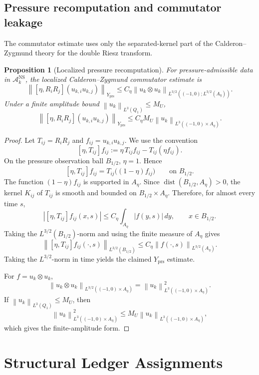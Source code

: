 \documentclass[11pt]{article}
\numberwithin{equation}{section}
\theoremstyle{plain}
\newtheorem{proposition}[theorem]{Proposition}
\theoremstyle{definition}
\theoremstyle{remark}
\newcommand{\NS}{\mathrm{NS}}
\newcommand{\prs}{\mathrm{prs}}
\newcommand{\A}{\mathcal A}
\newcommand{\norm}[1]{\left\lVert #1\right\rVert}
\begin{document}
\subsection{Pressure recomputation and commutator leakage}

The commutator estimate uses only the separated-kernel part of the Calderon--Zygmund theory for the double Riesz transform.

\begin{proposition}[Localized pressure recomputation]
\label{prop:commutator}
For pressure-admissible data in \(\A_k^{\NS}\), the localized
Calderon--Zygmund commutator estimate is
\[
  \norm{[\eta,R_iR_j](u_{k,i}u_{k,j})}_{Y_{\prs}}
  \le
  C_\eta\norm{u_k\otimes u_k}_{L^{3/2}((-1,0);L^{3/2}(A_\eta))}.
\]
Under a finite amplitude bound \(\norm{u_k}_{L^3(Q_1)}\le M_U\),
\[
  \norm{[\eta,R_iR_j](u_{k,i}u_{k,j})}_{Y_{\prs}}
  \le
  C_\eta M_U
  \norm{u_k}_{L^3((-1,0)\times A_\eta)}.
\]
\end{proposition}

\begin{proof}
Let \(T_{ij}=R_iR_j\) and \(f_{ij}=u_{k,i}u_{k,j}\).  We use the convention
\[
  [\eta,T_{ij}]f_{ij}
  :=
  \eta\,T_{ij}f_{ij}-T_{ij}(\eta f_{ij}).
\]
On the pressure observation ball \(B_{1/2}\), \(\eta=1\).  Hence
\[
  [\eta,T_{ij}]f_{ij}
  =
  T_{ij}\bigl((1-\eta)f_{ij}\bigr)
  \qquad\text{on }B_{1/2}.
\]
The function \((1-\eta)f_{ij}\) is supported in \(A_\eta\).  Since
\(\operatorname{dist}(B_{1/2},A_\eta)>0\), the kernel \(K_{ij}\) of \(T_{ij}\)
is smooth and bounded on \(B_{1/2}\times A_\eta\).  Therefore, for almost
every time \(s\),
\[
  |[\eta,T_{ij}]f_{ij}(x,s)|
  \le
  C_\eta\int_{A_\eta}|f(y,s)|\,dy,
  \qquad x\in B_{1/2}.
\]
Taking the \(L^{3/2}(B_{1/2})\)-norm and using the finite measure of
\(A_\eta\) gives
\[
  \norm{[\eta,T_{ij}]f_{ij}(\cdot,s)}_{L^{3/2}(B_{1/2})}
  \le
  C_\eta\norm{f(\cdot,s)}_{L^{3/2}(A_\eta)}.
\]
Taking the \(L^{3/2}\)-norm in time yields the claimed \(Y_{\prs}\) estimate.

For \(f=u_k\otimes u_k\),
\[
  \norm{u_k\otimes u_k}_{L^{3/2}((-1,0)\times A_\eta)}
  =
  \norm{u_k}_{L^3((-1,0)\times A_\eta)}^2.
\]
If \(\norm{u_k}_{L^3(Q_1)}\le M_U\), then
\[
  \norm{u_k}_{L^3((-1,0)\times A_\eta)}^2
  \le
  M_U\norm{u_k}_{L^3((-1,0)\times A_\eta)},
\]
which gives the finite-amplitude form.
\end{proof}


\section{Structural Ledger Assignments}
\label{sec:structural}
\end{document}
